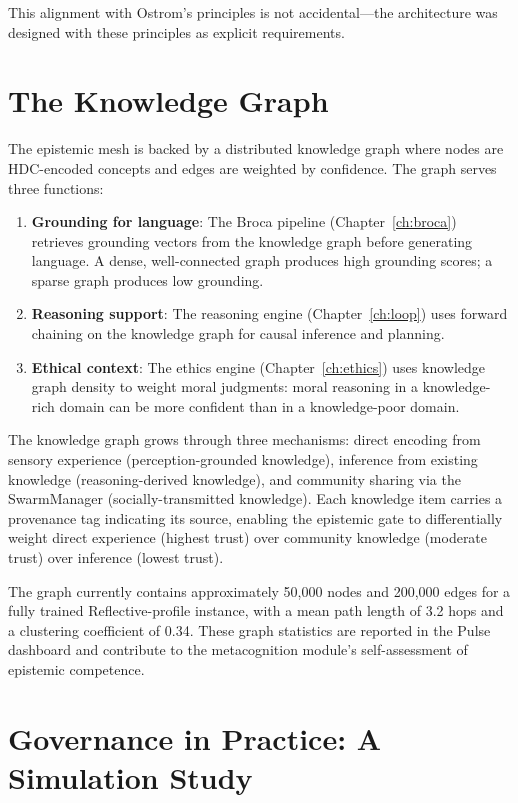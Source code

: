 \documentclass[12pt]{book}
\begin{document}
This alignment with Ostrom's principles is not accidental---the architecture was designed with these principles as explicit requirements.

\section{The Knowledge Graph}

The epistemic mesh is backed by a distributed knowledge graph where nodes are HDC-encoded concepts and edges are weighted by confidence. The graph serves three functions:

\begin{enumerate}
  \item \textbf{Grounding for language}: The Broca pipeline (Chapter~\ref{ch:broca}) retrieves grounding vectors from the knowledge graph before generating language. A dense, well-connected graph produces high grounding scores; a sparse graph produces low grounding.
  \item \textbf{Reasoning support}: The reasoning engine (Chapter~\ref{ch:loop}) uses forward chaining on the knowledge graph for causal inference and planning.
  \item \textbf{Ethical context}: The ethics engine (Chapter~\ref{ch:ethics}) uses knowledge graph density to weight moral judgments: moral reasoning in a knowledge-rich domain can be more confident than in a knowledge-poor domain.
\end{enumerate}

The knowledge graph grows through three mechanisms: direct encoding from sensory experience (perception-grounded knowledge), inference from existing knowledge (reasoning-derived knowledge), and community sharing via the SwarmManager (socially-transmitted knowledge). Each knowledge item carries a provenance tag indicating its source, enabling the epistemic gate to differentially weight direct experience (highest trust) over community knowledge (moderate trust) over inference (lowest trust).

The graph currently contains approximately 50,000 nodes and 200,000 edges for a fully trained Reflective-profile instance, with a mean path length of 3.2 hops and a clustering coefficient of 0.34. These graph statistics are reported in the Pulse dashboard and contribute to the metacognition module's self-assessment of epistemic competence.

\section{Governance in Practice: A Simulation Study}
\end{document}
